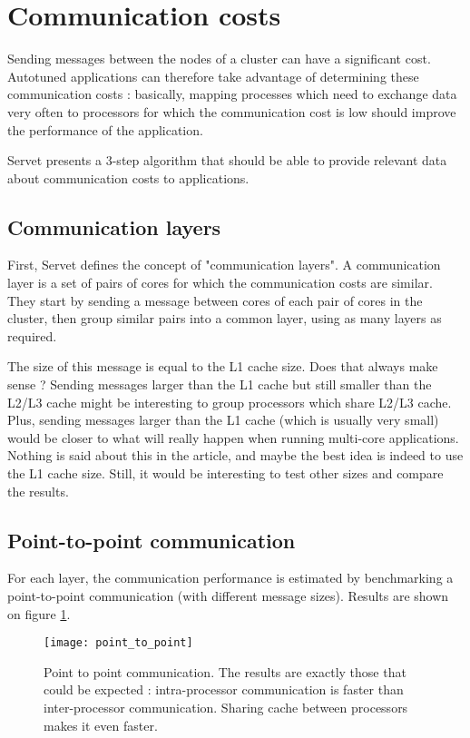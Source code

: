\section{Communication costs}
Sending messages between the nodes of a cluster can have a significant cost.
Autotuned applications can therefore take advantage of determining these
communication costs : basically, mapping processes which need to exchange data
very often to processors for which the communication cost is low should improve
the performance of the application\cite{MPIPP}.

Servet presents a 3-step algorithm that should be able to provide relevant data
about communication costs to applications.

\subsection{Communication layers}
First, Servet defines the concept of "communication layers". A communication
layer is a set of pairs of cores for which the communication costs are similar.
They start by sending a message between cores of each pair of cores in the
cluster, then group similar pairs into a common layer, using as many layers as
required.

The size of this message is equal to the L1 cache size. Does that always make
sense ? Sending messages larger than the L1 cache but still smaller than the
L2/L3 cache might be interesting to group processors which share L2/L3 cache.
Plus, sending messages larger than the L1 cache (which is usually very small)
would be closer to what will really happen when running multi-core applications.
Nothing is said about this in the article, and maybe the best idea is indeed to
use the L1 cache size. Still, it would be interesting to test other sizes and
compare the results.

\subsection{Point-to-point communication}
For each layer, the communication performance is estimated by benchmarking a
point-to-point communication (with different message sizes). Results are shown
on figure \ref{P2P}.

\begin{figure}[!ht]
    \label{P2P}
    \center
    \texttt{[image: point\_to\_point]}
    \caption{Point to point communication. The results are exactly those that
could be expected : intra-processor communication is faster than inter-processor
communication. Sharing cache between processors makes it even faster.}
\end{figure}

